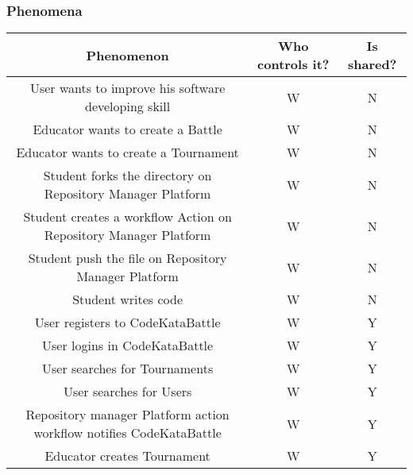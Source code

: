 \subsubsection{Phenomena}
\begin{center}
    \begin{table}[h]
        \begin{tabularx}{\textwidth}{| c| c| c|}
            \hline
            \rowcolor{blue!50}
            Phenomenon                                                            & Who controls it? & Is shared? \\
            \hline
            User wants to improve his software developing skill                   & W                & N          \\
            Educator wants to create a Battle                                     & W                & N          \\
            Educator wants to create a Tournament                                 & W                & N          \\
            Student forks the directory on Repository Manager Platform            & W                & N          \\
            Student creates a workflow Action on Repository Manager Platform      & W                & N          \\
            Student push the file on Repository Manager Platform                  & W                & N          \\
            Student writes code                                                    & W                & N          \\
            User registers to CodeKataBattle                                      & W                & Y          \\
            User logins in CodeKataBattle                                         & W                & Y          \\
            User searches for Tournaments                                         & W                & Y          \\
            User searches for Users                                               & W                & Y          \\
            Repository manager Platform action workflow notifies CodeKataBattle   & W                & Y          \\
            Educator creates Tournament                                           & W                & Y          \\

\end{tabularx}
\end{table}
\end{center}
